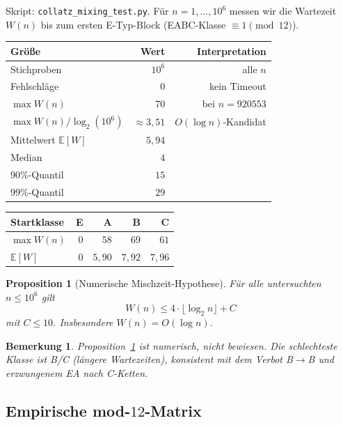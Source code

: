 \documentclass[12pt,a4paper]{article}
\newtheorem{proposition}[satz]{Proposition}
\newtheorem{bemerkung}[satz]{Bemerkung}
\begin{document}
Skript: \texttt{collatz\_mixing\_test.py}. Für $n=1,\ldots,10^6$ messen wir
die Wartezeit $W(n)$ bis zum ersten E-Typ-Block (EABC-Klasse $\equiv 1\pmod{12}$).

\begin{center}
\renewcommand{\arraystretch}{1.25}
\begin{tabular}{lrr}
\toprule
Größe & Wert & Interpretation \\
\midrule
Stichproben & $10^6$ & alle $n$ \\
Fehlschläge & $0$ & kein Timeout \\
$\max W(n)$ & $70$ & bei $n=920553$ \\
$\max W(n)/\log_2(10^6)$ & $\approx 3{,}51$ & $O(\log n)$-Kandidat \\
Mittelwert $\mathbb{E}[W]$ & $5{,}94$ & \\
Median & $4$ & \\
90\%-Quantil & $15$ & \\
99\%-Quantil & $29$ & \\
\bottomrule
\end{tabular}
\end{center}

\begin{center}
\renewcommand{\arraystretch}{1.2}
\begin{tabular}{lrrrr}
\toprule
Startklasse & E & A & B & C \\
\midrule
$\max W(n)$ & $0$ & $58$ & $69$ & $61$ \\
$\mathbb{E}[W]$ & $0$ & $5{,}90$ & $7{,}92$ & $7{,}96$ \\
\bottomrule
\end{tabular}
\end{center}

\begin{proposition}[Numerische Mischzeit-Hypothese]
\label{prop:mischhyp}
Für alle untersuchten $n\leq 10^6$ gilt
\[
  W(n) \leq 4\cdot\lfloor\log_2 n\rfloor + C
\]
mit $C\leq 10$. Insbesondere $W(n)=O(\log n)$.
\end{proposition}

\begin{bemerkung}
Proposition~\ref{prop:mischhyp} ist \emph{numerisch}, nicht bewiesen.
Die schlechteste Klasse ist B/C (längere Wartezeiten), konsistent mit
dem Verbot B$\to$B und erzwungenem EA nach C-Ketten.
\end{bemerkung}

\subsection{Empirische mod-$12$-Matrix}
\end{document}
